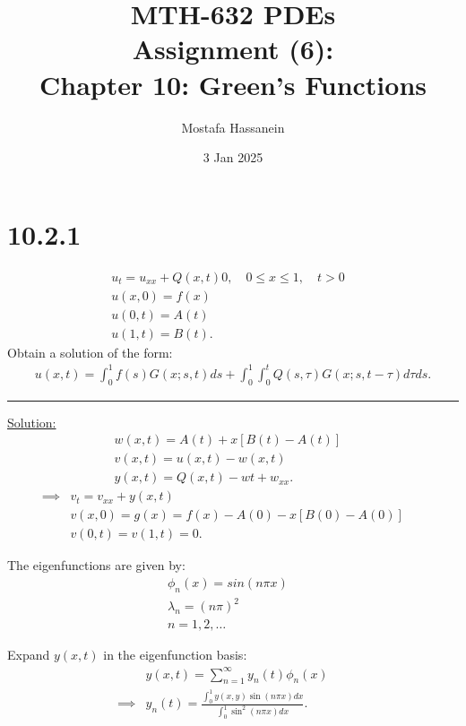 \documentclass{article}
\author{Mostafa Hassanein}
\title{
  MTH-632 PDEs \\
  Assignment (6): \\ Chapter 10: Green's Functions}
\date{3 Jan 2025}
\begin{document}
\maketitle
\newpage

\section*{10.2.1}
\begin{align*}
  &u_{t} = u_{xx} + Q(x, t) 0, \quad 0\leq x \leq 1, \quad t > 0 &&\\
  &u(x, 0) = f(x) &&\\
  &u(0, t) = A(t) &&\\
  &u(1, t) = B(t).
\end{align*}
Obtain a solution of the form:
\begin{align*}
  u(x,t) = \int_{0}^{1} f(s) G(x;s,t) ds +
  \int_{0}^{1} \int_{0}^{t} Q(s,\tau) G(x; s, t-\tau) d\tau ds.  
\end{align*}

\begin{center}
  \noindent\rule{8cm}{0.4pt}
\end{center}

\underline{Solution:}
\begin{align*}
  &w(x, t) = A(t) + x[B(t) - A(t)] &&\\
  &v(x, t) = u(x, t) - w(x, t) &&\\
  &y(x, t) = Q(x, t) - wt + w_{xx}.
\end{align*}
\begin{align*}
  \implies&v_{t} = v_{xx} + y(x, t) &&\\
  &v(x, 0) = g(x) = f(x) - A(0) - x[B(0) - A(0)] &&\\
  &v(0, t) = v(1, t) = 0.
\end{align*}
\newline

The eigenfunctions are given by:
\begin{align*}
  &\phi_{n}(x) = sin(n \pi x) &&\\ 
  &\lambda_n = (n\pi)^2 &&\\ 
  &n= 1, 2, \ldots
\end{align*}

Expand $y(x,t)$ in the eigenfunction basis:
\begin{align*}
  &y(x,t) = \sum_{n=1}^{\infty} y_n(t) \phi_n(x) &&\\
  \implies&y_n(t) = \frac{\int_{0}^{1} y(x,y) \sin(n \pi x) dx}{\int_{0}^{1} \sin^2(n \pi x) dx}.
\end{align*}
\end{document}
